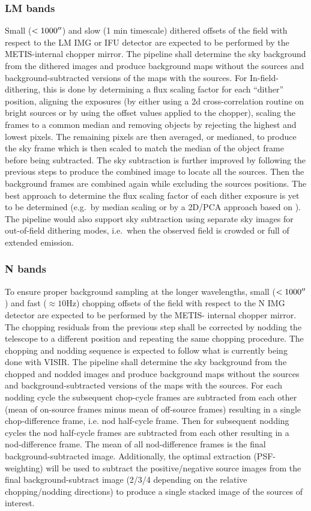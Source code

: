 \subsubsection{LM bands}
Small ($< 1000 \hbox{$^{\prime\prime}$}$) and slow (1 min timescale) dithered offsets of the field with respect to the LM IMG or \ac{IFU} detector are expected to be performed by the METIS-internal chopper mirror.
The pipeline shall determine the sky background from the dithered images and produce background maps without the sources and background-subtracted versions of the maps with the sources.
For In-field-dithering, this is done by determining a flux scaling factor for each ``dither'' position, aligning the exposures (by either using a 2d cross-correlation routine on bright sources or by using the offset values applied to the chopper), scaling the frames to a common median and removing objects by rejecting the highest and lowest pixels.
The remaining pixels are then averaged, or medianed, to produce the sky frame which is then scaled to match the median of the object frame before being subtracted.
The sky subtraction is further improved by following the previous steps to produce the combined image to locate all the sources.
Then the background frames are combined again while excluding the sources positions.
The best approach to determine the flux scaling factor of each dither exposure is yet to be determined (e.g.\ by median scaling or by a 2D/PCA approach based on \cite{Hunziker2018}).
The pipeline would also support sky subtraction using separate sky images for out-of-field dithering modes, i.e.\ when the observed field is crowded or full of extended emission.

\subsubsection{N bands}
To ensure proper background sampling at the longer wavelengths, small ($< 1000 \hbox{$^{\prime\prime}$}$) and fast ($\approx 10 \mathrm{Hz}$) chopping offsets of the field with respect to the N IMG detector are expected to be performed by the METIS- internal chopper mirror.
The chopping residuals from the previous step shall be corrected by nodding the telescope to a different position and repeating the same chopping procedure.
The chopping and nodding sequence is expected to follow what is currently being done with VISIR.
The pipeline shall determine the sky background from the chopped and nodded images and produce background maps without the sources and background-subtracted versions of the maps with the sources.
For each nodding cycle the subsequent chop-cycle frames are subtracted from each other (mean of on-source frames minus mean of off-source frames) resulting in a single chop-difference frame, i.e. nod half-cycle frame.
Then for subsequent nodding cycles the nod half-cycle frames are subtracted from each other resulting in a nod-difference frame.
The mean of all nod-difference frames is the final background-subtracted image.
Additionally, the optimal extraction (PSF-weighting) will be used to subtract the positive/negative source images from the final background-subtract image (2/3/4 depending on the relative chopping/nodding directions) to produce a single stacked image of the sources of interest.

